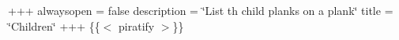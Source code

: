 +++ alwaysopen = false description = \char`\"{}\+List th\textquotesingle{} child planks on a plank\char`\"{} title = \char`\"{}\+Children\char`\"{} +++ \{\{$<$ piratify $>$\}\} 